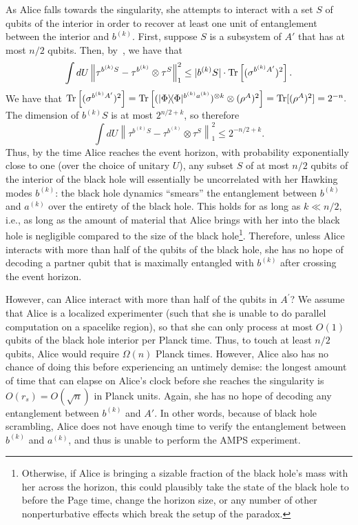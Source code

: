 \documentclass[a4paper,11pt]{article}
\theoremstyle{definition}
\newcommand{\ketbra}[2]{|#1\rangle\! \langle #2|}
\newcommand{\Tr}{\mbox{\rm Tr}}
\begin{document}
As Alice falls towards the singularity, she attempts to interact with a set $S$ of qubits of the interior in order to recover at least one unit of entanglement between the interior and $b^{(k)}$.
First, suppose $S$ is a subsystem of $A'$ that has at most $n/2$ qubits.
Then, by~\cite{Hayden:2007cs}, we have that
\begin{equation} \label{eq:decoupling}
	\int dU \left \| \tau^{b^{(k)} S} - \tau^{b^{(k)}} \otimes \tau^{S} \right \|_1^2 \leq |b^{(k)} S| \cdot \Tr \left [ (\sigma^{b^{(k)} A'})^2 \right ].
\end{equation}
We have that $\Tr \left [ (\sigma^{b^{(k)} A'})^2 \right ] = \Tr \left [ (\ketbra{\Phi}{\Phi}^{b^{(k)} a^{(k)}})^{\otimes k} \otimes (\rho^A)^2 \right ] = \Tr[(\rho^A)^2] = 2^{-n}.$ The dimension of $b^{(k)} S$ is at most $2^{n/2 + k}$, so therefore 
$$
\int dU \left \| \tau^{b^{(k)} S} - \tau^{b^{(k)}} \otimes \tau^{S} \right \|_1^2 \leq 2^{-n/2 + k}.
$$
Thus, by the time Alice reaches the event horizon, with probability exponentially close to one (over the choice of unitary $U$), any subset $S$ of at most $n/2$ qubits of the interior of the black hole will essentially be uncorrelated with her Hawking modes $b^{(k)}$: the black hole dynamics ``smears'' the entanglement between $b^{(k)}$ and $a^{(k)}$ over the entirety of the black hole. This holds for as long as $k \ll n/2$, i.e., as long as the amount of material that Alice brings with her into the black hole is negligible compared to the size of the black hole\footnote{Otherwise, if Alice is bringing a sizable fraction of the black hole's mass with her across the horizon, this could plausibly take the state of the black hole to before the Page time, change the horizon size, or any number of other nonperturbative effects which break the setup of the paradox.}.
Therefore, unless Alice interacts with more than half of the qubits of the black hole, she has no hope of decoding a partner qubit that is maximally entangled with $b^{(k)}$ after crossing the event horizon. 

However, can Alice interact with more than half of the qubits in $A^\prime$?
We assume that Alice is a localized experimenter (such that she is unable to do parallel computation on a spacelike region), so that she can only process at most $O(1)$ qubits of the black hole interior per Planck time.
Thus, to touch at least $n/2$ qubits, Alice would require $\Omega(n)$ Planck times.
However, Alice also has no chance of doing this before experiencing an untimely demise: the longest amount of time that can elapse on Alice's clock before she reaches the singularity is $O({r_s})=O(\sqrt{n})$ in Planck units.
Again, she has no hope of decoding any entanglement between $b^{(k)}$ and $A'$.
In other words, because of black hole scrambling, Alice does not have enough time to verify the entanglement between $b^{(k)}$ and $a^{(k)}$, and thus is unable to perform the AMPS experiment.
\end{document}
